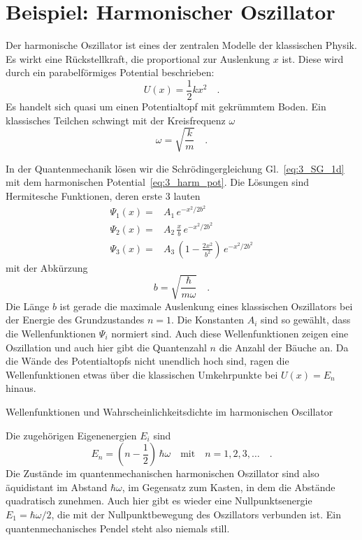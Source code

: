 \section{Beispiel: Harmonischer Oszillator}

Der harmonische Oszillator ist eines der zentralen Modelle der klassischen Physik. Es wirkt eine Rückstellkraft, die proportional zur Auslenkung $x$ ist. Diese wird durch ein parabelförmiges Potential beschrieben:
\begin{equation}
    U(x) = \frac{1}{2} k x^2 \quad .
    \label{eq:3_harm_pot}
\end{equation}
Es handelt sich quasi um einen Potentialtopf mit gekrümmtem Boden.
Ein klassisches Teilchen schwingt mit der Kreisfrequenz $\omega$
\begin{equation}
    \omega = \sqrt{\frac{k}{m}} \quad .
\end{equation}

In der Quantenmechanik lösen wir die Schrödingergleichung Gl.~\ref{eq:3_SG_1d} mit dem harmonischen Potential~\ref{eq:3_harm_pot}. Die Lösungen sind Hermitesche Funktionen, deren erste 3 lauten
\begin{align}
    \Psi_1(x) = & A_1 \, e^{-x^2 / 2 b^2} \\
    \Psi_2(x) = & A_2 \, \frac{x}{b} \, e^{-x^2 / 2 b^2} \\
    \Psi_3(x) = & A_3 \, \left(1- \frac{2x^2}{b^2} \right) \, e^{-x^2 / 2 b^2} 
\end{align}
mit der Abkürzung 
\begin{equation}
    b = \sqrt{\frac{\hbar}{m \omega}} \quad .
\end{equation}
Die Länge $b$ ist gerade die maximale Auslenkung eines klassischen Oszillators bei der Energie des Grundzustandes $n=1$. Die Konstanten $A_i$ sind so gewählt, dass die Wellenfunktionen $\Psi_i$ normiert sind. Auch diese Wellenfunktionen zeigen eine Oszillation und auch hier gibt die Quantenzahl $n$ die Anzahl der Bäuche an. Da die Wände des Potentialtopfs nicht unendlich hoch sind, ragen die Wellenfunktionen etwas über die klassischen Umkehrpunkte bei $U(x) = E_n$ hinaus.

\begin{marginfigure}
    \caption{Wellenfunktionen und Wahrscheinlichkeitsdichte im harmonischen Oscillator}
\end{marginfigure}

Die zugehörigen Eigenenergien $E_i$ sind
\begin{equation}
    E_n = \left( n - \frac{1}{2}\right) \, \hbar \omega \quad \text{mit} \quad n = 1, 2, 3, \dots \quad .
\end{equation}
Die Zustände im quantenmechanischen harmonischen Oszillator sind also äquidistant im Abstand $\hbar\omega$, im Gegensatz zum Kasten, in dem die Abstände quadratisch zunehmen. Auch hier gibt es wieder eine Nullpunktsenergie $E_1 = \hbar\omega/2$, die mit der Nullpunktbewegung des Oszillators verbunden ist. Ein quantenmechanisches Pendel steht also niemals still.

